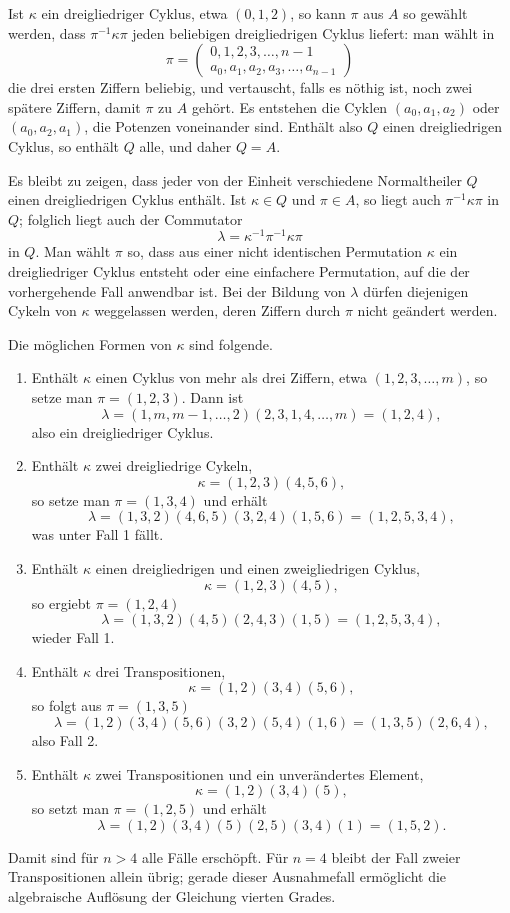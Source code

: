 \documentclass[11pt]{article}
\newcommand{\perm}[2]{\begin{pmatrix}#1\\#2\end{pmatrix}}
\begin{document}
Ist $\kappa$ ein dreigliedriger Cyklus, etwa $(0,1,2)$, so kann $\pi$ aus $A$ so gewählt werden, dass $\pi^{-1}\kappa\pi$ jeden beliebigen dreigliedrigen Cyklus liefert: man wählt in
\[
  \pi=\perm{0,1,2,3,\ldots,n-1}{a_0,a_1,a_2,a_3,\ldots,a_{n-1}}
\]
die drei ersten Ziffern beliebig, und vertauscht, falls es nöthig ist, noch zwei spätere Ziffern, damit $\pi$ zu $A$ gehört. Es entstehen die Cyklen $(a_0,a_1,a_2)$ oder $(a_0,a_2,a_1)$, die Potenzen voneinander sind. Enthält also $Q$ einen dreigliedrigen Cyklus, so enthält $Q$ alle, und daher $Q=A$.

Es bleibt zu zeigen, dass jeder von der Einheit verschiedene Normaltheiler $Q$ einen dreigliedrigen Cyklus enthält. Ist $\kappa\in Q$ und $\pi\in A$, so liegt auch $\pi^{-1}\kappa\pi$ in $Q$; folglich liegt auch der Commutator
\[
  \lambda=\kappa^{-1}\pi^{-1}\kappa\pi                                      \tag{1}
\]
in $Q$. Man wählt $\pi$ so, dass aus einer nicht identischen Permutation $\kappa$ ein dreigliedriger Cyklus entsteht oder eine einfachere Permutation, auf die der vorhergehende Fall anwendbar ist. Bei der Bildung von $\lambda$ dürfen diejenigen Cykeln von $\kappa$ weggelassen werden, deren Ziffern durch $\pi$ nicht geändert werden.

Die möglichen Formen von $\kappa$ sind folgende.
\begin{enumerate}[label=\arabic*.]
\item Enthält $\kappa$ einen Cyklus von mehr als drei Ziffern, etwa $(1,2,3,\ldots,m)$, so setze man $\pi=(1,2,3)$. Dann ist
\[
\lambda=(1,m,m-1,\ldots,2)(2,3,1,4,\ldots,m)=(1,2,4),
\]
also ein dreigliedriger Cyklus.
\item Enthält $\kappa$ zwei dreigliedrige Cykeln,
\[
  \kappa=(1,2,3)(4,5,6),
\]
so setze man $\pi=(1,3,4)$ und erhält
\[
\lambda=(1,3,2)(4,6,5)(3,2,4)(1,5,6)=(1,2,5,3,4),
\]
was unter Fall 1 fällt.
\item Enthält $\kappa$ einen dreigliedrigen und einen zweigliedrigen Cyklus,
\[
  \kappa=(1,2,3)(4,5),
\]
so ergiebt $\pi=(1,2,4)$
\[
\lambda=(1,3,2)(4,5)(2,4,3)(1,5)=(1,2,5,3,4),
\]
wieder Fall 1.
\item Enthält $\kappa$ drei Transpositionen,
\[
  \kappa=(1,2)(3,4)(5,6),
\]
so folgt aus $\pi=(1,3,5)$
\[
\lambda=(1,2)(3,4)(5,6)(3,2)(5,4)(1,6)=(1,3,5)(2,6,4),
\]
also Fall 2.
\item Enthält $\kappa$ zwei Transpositionen und ein unverändertes Element,
\[
  \kappa=(1,2)(3,4)(5),
\]
so setzt man $\pi=(1,2,5)$ und erhält
\[
\lambda=(1,2)(3,4)(5)(2,5)(3,4)(1)=(1,5,2).
\]
\end{enumerate}
Damit sind für $n>4$ alle Fälle erschöpft. Für $n=4$ bleibt der Fall zweier Transpositionen allein übrig; gerade dieser Ausnahmefall ermöglicht die algebraische Auflösung der Gleichung vierten Grades.
\end{document}
